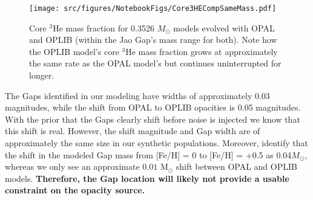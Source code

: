\begin{figure}
	\centering
	\texttt{[image: src/figures/NotebookFigs/Core3HECompSameMass.pdf]}
	\caption{Core $^{3}$He mass fraction for  0.3526 $M_{\odot}$ models evolved
	with OPAL and OPLIB (within the Jao Gap's mass range for both). Note how
	the OPLIB model's core $^{3}$He mass fraction grows at approximately the
	same rate as the OPAL model's but continues uninterrupted for longer.}
	\label{fig:OPALOPLIB3He}
\end{figure}

The Gaps identified in our modeling have widths of approximately 0.03
magnitudes, while the shift from OPAL to OPLIB opacities is 0.05 magnitudes.
With the prior that the Gaps clearly shift before noise is injected we know
that this shift is real. However, the shift magnitude and Gap width are of
approximately the same size in our synthetic populations. Moreover,
\citet{Feiden2021} identify that the shift in the modeled Gap mass from [Fe/H]
= 0 to [Fe/H] = +0.5 as 0.04$M_{\odot}$, whereas we only see an approximate
$0.01$ M$_{\odot}$ shift between OPAL and OPLIB models. \textbf{Therefore, the
Gap location will likely not provide a usable constraint on the opacity
source.} 
